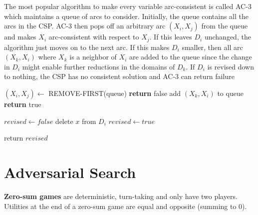 \documentclass{article}
\begin{document}
The most popular algorithm to make every variable arc-consistent is called AC-3 which maintains a queue of arcs to consider. Initially, the queue contains all the arcs in the CSP. AC-3 then pops off an arbitrary arc $(X_i,X_j)$ from the queue and makes $X_i$ arc-consistent with respect to $X_j$. If this leaves $D_i$ unchanged, the algorithm just moves on to the next arc. If this makes $D_i$ smaller, then all arc $(X_k,X_i)$ where $X_k$ is a neighbor of $X_i$ are added to the queue since the change in $D_i$ might enable further reductions in the domains of $D_k$. If $D_i$ is revised down to nothing, the CSP has no consistent solution and AC-3 can return failure


\begin{algorithm}
\begin{algorithmic}

        \State $(X_i,X_j) \leftarrow$ REMOVE-FIRST(queue)
                \State \textbf{return} false
                    \State add $(X_k,X_i)$ to queue
                \EndFor
            \EndIf
        \EndIf
    \EndWhile 
    \State \textbf{return} true 
\EndProcedure


    \State $revised \leftarrow false$
            \State delete $x$ from $D_i$
            \State $revised \leftarrow true$
        \EndIf
        
    \EndFor

    \State return $revised$

\EndProcedure

\end{algorithmic}
\end{algorithm}


\section{Adversarial Search}

\textbf{Zero-sum games} are deterministic, turn-taking and only have two players. Utilities at the end of a zero-sum game are equal and opposite (summing to 0). 
\end{document}
